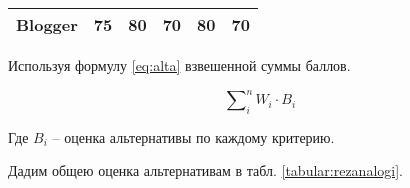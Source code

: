 \begin{table}[H]
\begin{center}
\begin{tabular}{|l|l|l|l|l|l|}
Blogger                       & 75                                                                                     & 80                                                                   & 70                                                                    & 80                                                                                     & 70                                                                              \\ \hline
\end{tabular}
	\end{center}
\end{table}


Используя формулу \ref{eq:alta} взвешенной суммы баллов.

\begin{equation}\label{eq:alta}
\sum\nolimits_i^n {W_i  \cdot } B_i 
\end{equation}

Где $B_i$ -- оценка альтернативы по каждому критерию.

Дадим общею оценка альтернативам в табл. \ref{tabular:rezanalogi}.

